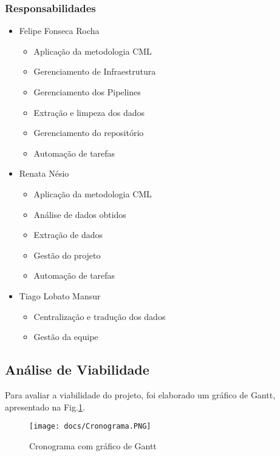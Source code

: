 \documentclass[journal]{IEEEtran}
\begin{document}
\subsubsection{Responsabilidades}
\begin{itemize}
   \item Felipe Fonseca Rocha
   \begin{itemize}
     \item Aplicação da metodologia CML
     \item Gerenciamento de Infraestrutura
     \item Gerenciamento dos Pipelines
     \item Extração e limpeza dos dados
     \item Gerenciamento do repositório
     \item Automação de tarefas 
   \end{itemize}
   
    \item Renata Nésio
   \begin{itemize}
     \item Aplicação da metodologia CML
    \item Análise de dados obtidos
     \item Extração de dados
     \item Gestão do projeto
     \item Automação de tarefas 

   \end{itemize}
   
   \item Tiago Lobato Mansur
   \begin{itemize}
     \item Centralização e tradução dos dados
     \item Gestão da equipe
   \end{itemize}
\end{itemize}
\subsection{Análise de Viabilidade}

Para avaliar a viabilidade do projeto, foi elaborado um gráfico de Gantt, apresentado na Fig.\ref{fig:Gantt}.

\begin{figure}[htpb]
    \centering
    \texttt{[image: docs/Cronograma.PNG]}
    \caption{Cronograma com gráfico de Gantt}
    \label{fig:Gantt}
    \centering
\end{figure}
\end{document}

